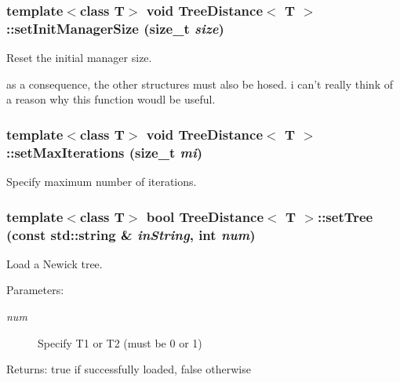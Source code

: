 \subsubsection{\setlength{\rightskip}{0pt plus 5cm}template$<$class T$>$ void {\bf Tree\-Distance}$<$ T $>$::set\-Init\-Manager\-Size (size\_\-t {\em size})}\label{classTreeDistance_a4}


Reset the initial manager size. 

as a consequence, the other structures must also be hosed. i can't really think of a reason why this function woudl be useful. 
\subsubsection{\setlength{\rightskip}{0pt plus 5cm}template$<$class T$>$ void {\bf Tree\-Distance}$<$ T $>$::set\-Max\-Iterations (size\_\-t {\em mi})}\label{classTreeDistance_a3}


Specify maximum number of iterations. 

\subsubsection{\setlength{\rightskip}{0pt plus 5cm}template$<$class T$>$ bool {\bf Tree\-Distance}$<$ T $>$::set\-Tree (const std::string \& {\em in\-String}, int {\em num})}\label{classTreeDistance_a6}


Load a Newick tree. 

\begin{Desc}
\item[Parameters:]
\begin{description}
\item[{\em num}]Specify T1 or T2 (must be 0 or 1) \end{description}
\end{Desc}
\begin{Desc}
\item[Returns:]true if successfully loaded, false otherwise \end{Desc}
